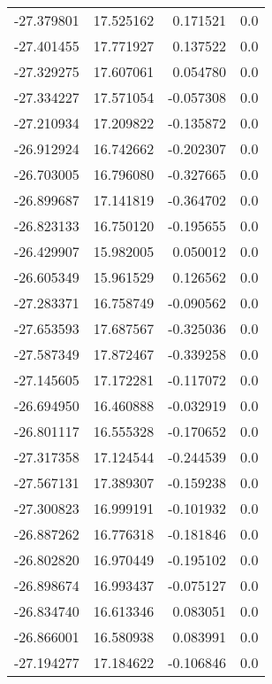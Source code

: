 \begin{tabular}{rrrr}
      -27.379801 &        17.525162 &    0.171521 &   0.0 \\
      -27.401455 &        17.771927 &    0.137522 &   0.0 \\
      -27.329275 &        17.607061 &    0.054780 &   0.0 \\
      -27.334227 &        17.571054 &   -0.057308 &   0.0 \\
      -27.210934 &        17.209822 &   -0.135872 &   0.0 \\
      -26.912924 &        16.742662 &   -0.202307 &   0.0 \\
      -26.703005 &        16.796080 &   -0.327665 &   0.0 \\
      -26.899687 &        17.141819 &   -0.364702 &   0.0 \\
      -26.823133 &        16.750120 &   -0.195655 &   0.0 \\
      -26.429907 &        15.982005 &    0.050012 &   0.0 \\
      -26.605349 &        15.961529 &    0.126562 &   0.0 \\
      -27.283371 &        16.758749 &   -0.090562 &   0.0 \\
      -27.653593 &        17.687567 &   -0.325036 &   0.0 \\
      -27.587349 &        17.872467 &   -0.339258 &   0.0 \\
      -27.145605 &        17.172281 &   -0.117072 &   0.0 \\
      -26.694950 &        16.460888 &   -0.032919 &   0.0 \\
      -26.801117 &        16.555328 &   -0.170652 &   0.0 \\
      -27.317358 &        17.124544 &   -0.244539 &   0.0 \\
      -27.567131 &        17.389307 &   -0.159238 &   0.0 \\
      -27.300823 &        16.999191 &   -0.101932 &   0.0 \\
      -26.887262 &        16.776318 &   -0.181846 &   0.0 \\
      -26.802820 &        16.970449 &   -0.195102 &   0.0 \\
      -26.898674 &        16.993437 &   -0.075127 &   0.0 \\
      -26.834740 &        16.613346 &    0.083051 &   0.0 \\
      -26.866001 &        16.580938 &    0.083991 &   0.0 \\
      -27.194277 &        17.184622 &   -0.106846 &   0.0 \\

\end{tabular}

